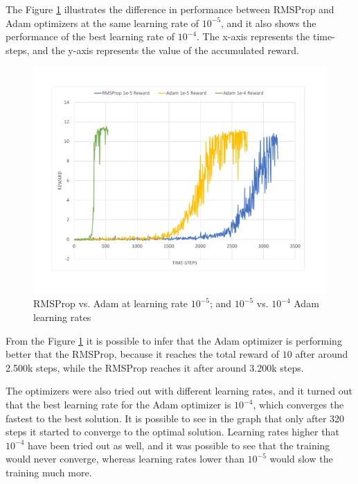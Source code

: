 The Figure \ref{fig:OptimizersReward} illustrates the difference in performance between RMSProp and Adam optimizers at the same learning rate of $10^{-5}$, and it also shows the performance of the best learning rate of $10^{-4}$. The x-axis represents the time-steps, and the y-axis represents the value of the accumulated reward.
\begin{figure}[H]
	\centering
	\includegraphics[width=\textwidth]{Figures/OptimizersReward}
	\caption{RMSProp vs. Adam at learning rate $10^{-5}$; and $10^{-5}$ vs. $10^{-4}$ Adam learning rates}
	\label{fig:OptimizersReward}
\end{figure}
From the Figure \ref{fig:OptimizersReward} it is possible to infer that the Adam optimizer is performing better that the RMSProp, because it reaches the total reward of $10$ after around 2.500k steps, while the RMSProp reaches it after around 3.200k steps.

The optimizers were also tried out with different learning rates, and it turned out that the best learning rate for the Adam optimizer is $10^{-4}$, which converges the fastest to the best solution. It is possible to see in the graph that only after 320 steps it started to converge to the optimal solution. Learning rates higher that $10^{-4}$ have been tried out as well, and it was possible to see that the training would never converge, whereas learning rates lower than $10^{-5}$ would slow the training much more.